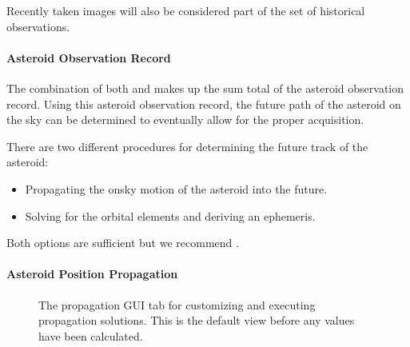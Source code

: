 \documentclass[letterpaper,11pt,english]{sphinxmanual}
\begin{document}
\sphinxAtStartPar
Recently taken images will also be considered part of the set of historical
observations.


\paragraph{Asteroid Observation Record}
\label{\detokenize{user/manual_mode:asteroid-observation-record}}\label{\detokenize{user/manual_mode:user-manual-mode-procedure-asteroid-observation-record}}
\sphinxAtStartPar
The combination of both {\hyperref[\detokenize{user/manual_mode:user-manual-mode-procedure-historical-observations}]{}}
and {\hyperref[\detokenize{user/manual_mode:user-manual-mode-procedure-asteroid-on-sky-position}]{}} makes up the
sum total of the asteroid observation record. Using this asteroid observation
record, the future path of the asteroid on the sky can be determined to
eventually allow for the proper acquisition.

\sphinxAtStartPar
There are two different procedures for determining the future track of the
asteroid:
\begin{itemize}
\item {} 
\sphinxAtStartPar
Propagating the on\sphinxhyphen{}sky motion of the asteroid into the future.

\item {} 
\sphinxAtStartPar
Solving for the orbital elements and deriving an ephemeris.

\end{itemize}

\sphinxAtStartPar
Both options are sufficient but we recommend
{\hyperref[\detokenize{user/manual_mode:user-manual-mode-procedure-asteroid-position-propagation}]{}}.


\paragraph{Asteroid Position Propagation}
\label{\detokenize{user/manual_mode:asteroid-position-propagation}}\label{\detokenize{user/manual_mode:user-manual-mode-procedure-asteroid-position-propagation}}
\begin{figure}[H]
\centering
\capstart

\noindent{}
\caption{The propagation GUI tab for customizing and executing propagation solutions.
This is the default view before any values have been calculated.}\label{\detokenize{user/manual_mode:id7}}\label{\detokenize{user/manual_mode:figure-manual-mode-gui-propagate}}\end{figure}
\end{document}

